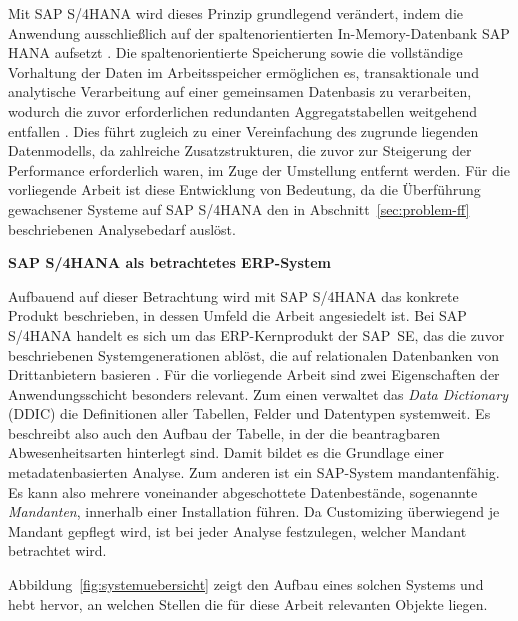 Mit SAP S/4HANA wird dieses Prinzip grundlegend verändert, indem die Anwendung
ausschließlich auf der spaltenorientierten In-Memory-Datenbank SAP HANA aufsetzt
\cite{sap_se_sap_nodate}. Die spaltenorientierte Speicherung sowie die
vollständige Vorhaltung der Daten im Arbeitsspeicher ermöglichen es,
transaktionale und analytische Verarbeitung auf einer gemeinsamen Datenbasis zu %
verarbeiten, wodurch die zuvor erforderlichen redundanten Aggregatstabellen
weitgehend entfallen \cite{plattner_common_2009, sikka_efficient_2012}. Dies
führt zugleich zu einer Vereinfachung des zugrunde liegenden Datenmodells, da
zahlreiche Zusatzstrukturen, die zuvor zur Steigerung der Performance erforderlich waren, %
im Zuge der Umstellung entfernt werden. %
Für die vorliegende Arbeit ist diese Entwicklung von Bedeutung, da die Überführung gewachsener Systeme auf SAP S/4HANA den in Abschnitt~\ref{sec:problem-ff} beschriebenen Analysebedarf auslöst.

\textbf{SAP S/4HANA als betrachtetes ERP-System}

Aufbauend auf dieser Betrachtung wird mit SAP S/4HANA das konkrete Produkt
beschrieben, in dessen Umfeld die Arbeit angesiedelt ist. Bei SAP S/4HANA handelt
es sich um das ERP-Kernprodukt der SAP~SE, das die zuvor beschriebenen %
Systemgenerationen ablöst, die auf relationalen Datenbanken von Drittanbietern basieren %
\cite{gerard_sap_2017}. %
Für die vorliegende Arbeit sind zwei Eigenschaften der Anwendungsschicht besonders relevant. Zum einen verwaltet das \emph{Data Dictionary} (DDIC) die Definitionen aller Tabellen, Felder und Datentypen systemweit. Es beschreibt also auch den Aufbau der Tabelle, in der die beantragbaren Abwesenheitsarten hinterlegt sind. Damit bildet es die Grundlage einer metadatenbasierten Analyse. Zum anderen ist ein SAP-System mandantenfähig. Es kann also mehrere voneinander abgeschottete Datenbestände, sogenannte \emph{Mandanten}, innerhalb einer Installation führen. Da Customizing überwiegend je Mandant gepflegt wird, ist bei jeder Analyse festzulegen, welcher Mandant betrachtet wird.

Abbildung~\ref{fig:systemuebersicht} zeigt den Aufbau eines solchen Systems und hebt hervor, an welchen Stellen die für diese Arbeit relevanten Objekte liegen.

